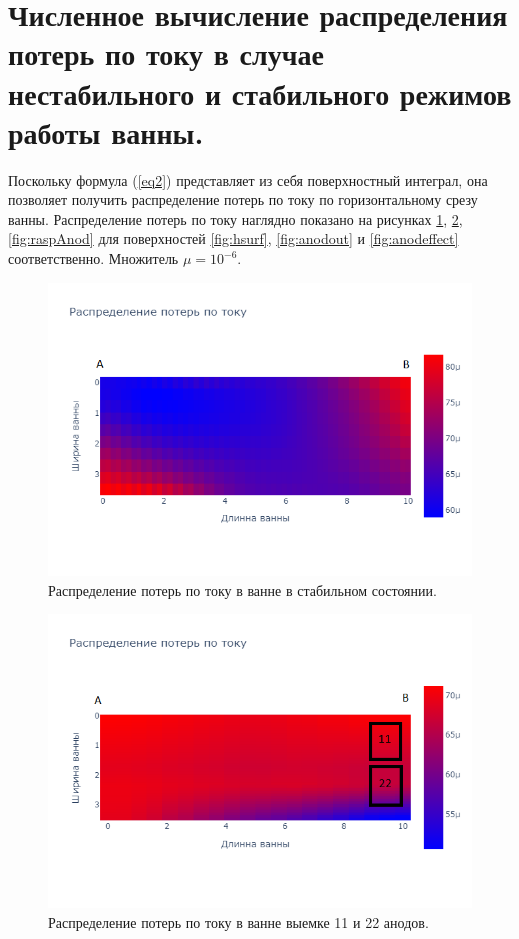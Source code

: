 \documentclass{article}
\begin{document}
\newpage
\section{Численное вычисление распределения потерь по току в случае нестабильного и стабильного режимов работы ванны.}

Поскольку формула (\ref{eq2}) представляет из себя поверхностный интеграл, она позволяет получить распределение потерь по току по горизонтальному срезу ванны. Распределение потерь по току наглядно показано на рисунках \ref{fig:raspStab}, \ref{fig:raspAnodOut}, \ref{fig:raspAnod} для поверхностей \ref{fig:hsurf}, \ref{fig:anodout} и \ref{fig:anodeffect} соответственно. Множитель $\mu = 10^{-6}$.

\begin{figure}[H]
\centering
\includegraphics[width=0.8\linewidth]{hloss.png}
\caption{Распределение потерь по току в ванне в стабильном состоянии.\label{fig:raspStab}}
\end{figure}

\begin{figure}[H]
\centering
\includegraphics[width=0.8\linewidth]{surfloss.png}
\caption{Распределение потерь по току в ванне выемке 11 и 22 анодов.\label{fig:raspAnodOut}}
\end{figure}
\end{document}
